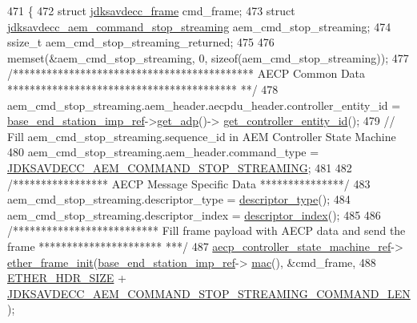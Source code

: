 \begin{DoxyCode}
471 \{
472     \textcolor{keyword}{struct }\hyperlink{structjdksavdecc__frame}{jdksavdecc\_frame} cmd\_frame;
473     \textcolor{keyword}{struct }\hyperlink{structjdksavdecc__aem__command__stop__streaming}{jdksavdecc\_aem\_command\_stop\_streaming} 
      aem\_cmd\_stop\_streaming;
474     ssize\_t aem\_cmd\_stop\_streaming\_returned;
475 
476     memset(&aem\_cmd\_stop\_streaming, 0, \textcolor{keyword}{sizeof}(aem\_cmd\_stop\_streaming));
477     \textcolor{comment}{/******************************************* AECP Common Data *****************************************
      **/}
478     aem\_cmd\_stop\_streaming.aem\_header.aecpdu\_header.controller\_entity\_id = 
      \hyperlink{classavdecc__lib_1_1descriptor__base__imp_a550c969411f5f3b69f55cc139763d224}{base\_end\_station\_imp\_ref}->\hyperlink{classavdecc__lib_1_1end__station__imp_a471a74540ce6182fad0c17dfd010107e}{get\_adp}()->
      \hyperlink{classavdecc__lib_1_1adp_a0c0959a46658c0a22e9530334b2912da}{get\_controller\_entity\_id}();
479     \textcolor{comment}{// Fill aem\_cmd\_stop\_streaming.sequence\_id in AEM Controller State Machine}
480     aem\_cmd\_stop\_streaming.aem\_header.command\_type = 
      \hyperlink{group__command_ga662d8e95498967710f7f3a281987fd6c}{JDKSAVDECC\_AEM\_COMMAND\_STOP\_STREAMING};
481 
482     \textcolor{comment}{/***************** AECP Message Specific Data ***************/}
483     aem\_cmd\_stop\_streaming.descriptor\_type = \hyperlink{classavdecc__lib_1_1descriptor__base__imp_aefc543029ab093823c3f5b9d84f0ccc4}{descriptor\_type}();
484     aem\_cmd\_stop\_streaming.descriptor\_index = \hyperlink{classavdecc__lib_1_1descriptor__base__imp_ac23c0a35276c07cfce8c8660700c2135}{descriptor\_index}();
485 
486     \textcolor{comment}{/************************** Fill frame payload with AECP data and send the frame **********************
      ***/}
487     \hyperlink{namespaceavdecc__lib_a0b1b5aea3c0490f77cbfd9178af5be22}{aecp\_controller\_state\_machine\_ref}->
      \hyperlink{classavdecc__lib_1_1aecp__controller__state__machine_a86ff947c5e6b799cfb877d3767bfa1f9}{ether\_frame\_init}(\hyperlink{classavdecc__lib_1_1descriptor__base__imp_a550c969411f5f3b69f55cc139763d224}{base\_end\_station\_imp\_ref}->
      \hyperlink{classavdecc__lib_1_1end__station__imp_a08e1bd1861b3b8f447ea374a65ac11f9}{mac}(), &cmd\_frame,
488                                                         \hyperlink{namespaceavdecc__lib_a6c827b1a0d973e18119c5e3da518e65ca9512ad9b34302ba7048d88197e0a2dc0}{ETHER\_HDR\_SIZE} + 
      \hyperlink{group__command__stop__streaming_ga37e2bec2217af78aed138bbf254234d0}{JDKSAVDECC\_AEM\_COMMAND\_STOP\_STREAMING\_COMMAND\_LEN});

\end{DoxyCode}
